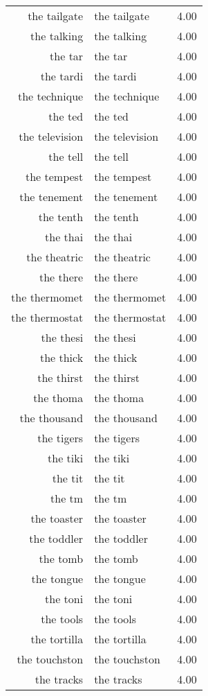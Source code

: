 \begin{table}[ht]
\begin{tabular}{rlr}
  the tailgate & the tailgate & 4.00 \\ 
  the talking & the talking & 4.00 \\ 
  the tar & the tar & 4.00 \\ 
  the tardi & the tardi & 4.00 \\ 
  the technique & the technique & 4.00 \\ 
  the ted & the ted & 4.00 \\ 
  the television & the television & 4.00 \\ 
  the tell & the tell & 4.00 \\ 
  the tempest & the tempest & 4.00 \\ 
  the tenement & the tenement & 4.00 \\ 
  the tenth & the tenth & 4.00 \\ 
  the thai & the thai & 4.00 \\ 
  the theatric & the theatric & 4.00 \\ 
  the there & the there & 4.00 \\ 
  the thermomet & the thermomet & 4.00 \\ 
  the thermostat & the thermostat & 4.00 \\ 
  the thesi & the thesi & 4.00 \\ 
  the thick & the thick & 4.00 \\ 
  the thirst & the thirst & 4.00 \\ 
  the thoma & the thoma & 4.00 \\ 
  the thousand & the thousand & 4.00 \\ 
  the tigers & the tigers & 4.00 \\ 
  the tiki & the tiki & 4.00 \\ 
  the tit & the tit & 4.00 \\ 
  the tm & the tm & 4.00 \\ 
  the toaster & the toaster & 4.00 \\ 
  the toddler & the toddler & 4.00 \\ 
  the tomb & the tomb & 4.00 \\ 
  the tongue & the tongue & 4.00 \\ 
  the toni & the toni & 4.00 \\ 
  the tools & the tools & 4.00 \\ 
  the tortilla & the tortilla & 4.00 \\ 
  the touchston & the touchston & 4.00 \\ 
  the tracks & the tracks & 4.00 \\ 

\end{tabular}
\end{table}
